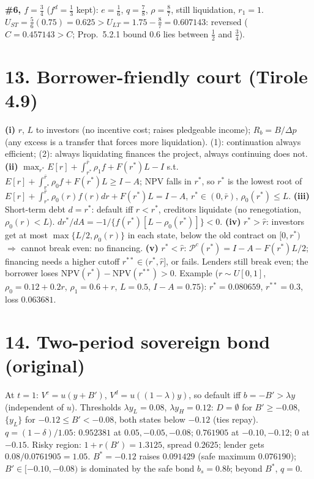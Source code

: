 \documentclass[11pt,a4paper]{article}
\begin{document}
\textbf{\#6, $f=\frac34$} ($f^d=\frac13$ kept): $e=\frac16$, $q=\frac78$, $\rho=\frac87$, still liquidation, $r_1=1$.
$U_{ST}=\frac56(0.75)=0.625>U_{LT}=1.75-\frac87=0.607143$: reversed ($\widehat C=0.457143>C$; Prop.\ 5.2.1 bound $0.6$ lies between $\frac12$ and $\frac34$).

\section*{13. Borrower-friendly court (Tirole 4.9)}

\textbf{(i)} $r$, $L$ to investors (no incentive cost; raises pledgeable income); $R_b=B/\Delta p$ (any excess is a transfer that forces more liquidation).
(1): continuation always efficient; (2): always liquidating finances the project, always continuing does not.
\textbf{(ii)} $\max_{r^*}E[r]+\int_{r^*}^{\bar r}\rho_1f+F(r^*)L-I$ s.t.\ $E[r]+\int_{r^*}^{\bar r}\rho_0f+F(r^*)L\ge I-A$; NPV falls in $r^*$, so $r^*$ is the lowest root of
$E[r]+\int_{r^*}^{\bar r}\rho_0(r)f(r)dr+F(r^*)L=I-A$, $r^*\in(0,\bar r)$, $\rho_0(r^*)\le L$.
\textbf{(iii)} Short-term debt $d=r^*$: default iff $r<r^*$, creditors liquidate (no renegotiation, $\rho_0(r)<L$). $dr^*/dA=-1/\{f(r^*)[L-\rho_0(r^*)]\}<0$.
\textbf{(iv)} $r^*>\hat r$: investors get at most $\max\{L/2,\rho_0(r)\}$ in each state, below the old contract on $[0,r^*)$ $\Rightarrow$ cannot break even: no financing.
\textbf{(v)} $r^*<\hat r$: $\mathcal P^c(r^*)=I-A-F(r^*)L/2$; financing needs a higher cutoff $r^{**}\in(r^*,\hat r]$, or fails. Lenders still break even; the borrower loses $\text{NPV}(r^*)-\text{NPV}(r^{**})>0$.
Example ($r\sim U[0,1]$, $\rho_0=0.12+0.2r$, $\rho_1=0.6+r$, $L=0.5$, $I-A=0.75$): $r^*=0.080659$, $r^{**}=0.3$, loss $0.063681$.

\section*{14. Two-period sovereign bond (original)}

At $t=1$: $V^c=u(y+B')$, $V^d=u((1-\lambda)y)$, so default iff $b=-B'>\lambda y$ (independent of $u$). Thresholds $\lambda y_L=0.08$, $\lambda y_H=0.12$:
$D=\emptyset$ for $B'\ge-0.08$, $\{y_L\}$ for $-0.12\le B'<-0.08$, both states below $-0.12$ (ties repay).
$q=(1-\delta)/1.05$: $0.952381$ at $0.05,-0.05,-0.08$; $0.761905$ at $-0.10,-0.12$; $0$ at $-0.15$.
Risky region: $1+r(B')=1.3125$, spread $0.2625$; lender gets $0.08/0.0761905=1.05$.
$B^*=-0.12$ raises $0.091429$ (safe maximum $0.076190$); $B'\in[-0.10,-0.08)$ is dominated by the safe bond $b_s=0.8b$; beyond $B^*$, $q=0$.
\end{document}
